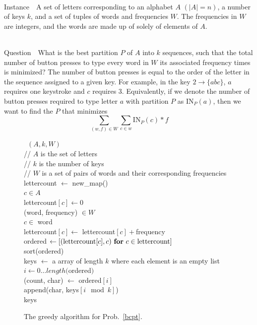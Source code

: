 \documentclass[runningheads]{llncs}
\newcommand{\Instance}{{\sc Instance~}}
\newcommand{\Question}{~\\
{\sc Question~}}
\begin{document}
\begin{prob}[{\sc
MinimumKeystrokes}]
{\begin{prob}[{\sc BasicCellPhoneTyping}]~\\
\Instance\ A set of letters corresponding to an alphabet $A$ $(|A| =
n)$, a number of keys $k$, and a set of
tuples of words and frequencies $W$.  The frequencies in $W$ are integers,
and the words are made up of solely of elements of $A$. 

\Question\ What is the best partition $P$ of $A$ into $k$ sequences, such
that the total number of button presses to type every word in $W$ its
associated frequency times is minimized?  The number of button presses is equal
to the order of the letter in the sequence assigned to a given key.  For
example, in the key $2\to\{abc\}$, $a$ requires one keystroke and $c$ requires
3.  Equivalently, if we denote the number of button presses required to type
letter $a$ with partition $P$ as $\mathrm{IN}_P(a)$, then we want to find the $P$ that
minimizes $$\sum_{(w,f) \in W}\sum_{c\in w} \mathrm{IN}_P(c) * f$$
\label{bcpt}
\end{prob}

\begin{figure}
\begin{algorithm}
~$(A, k, W)$\+\\
    // $A$ is the set of letters \\
    // $k$ is the number of keys \\
    // $W$ is a set of pairs of words and their corresponding frequencies \\
    lettercount $\gets$ new\_map() \\
    \For $c \in A$\+\\
        lettercount$[c] \gets 0$\-\\
    \For (word, frequency) $\in W$\+\\
        \For $c \in$ word \+\\
            lettercount$[c] \gets $ lettercount$[c] +$frequency\-\-\\
    ordered $\gets \left[ ({\rm lettercount}[c], c)~\For c \in {\rm lettercount} \right]$\\
    sort(ordered)\\
    keys $\gets$ a array of length $k$ where each element is an empty list\\
    \For $i \gets 0 \ldots length($ordered$)$\+\\
        (count, char) $\gets$ ordered$[i]$\\
        append(char, keys$[i\mod k]$)\-\\
    \Return keys
\end{algorithm}
\caption{The greedy algorithm for Prob.~\ref{bcpt}.}
\label{greedyalg}
\end{figure}

}
\end{prob}
\end{document}
